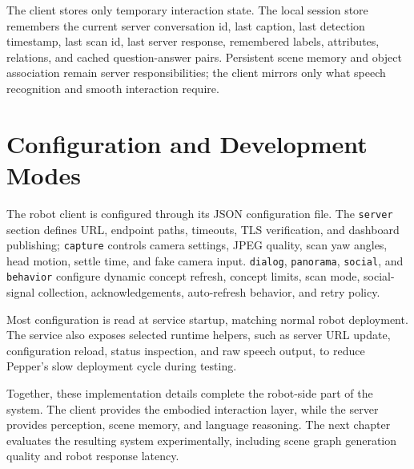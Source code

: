 The client stores only temporary interaction state.
The local session store remembers the current server conversation id, last caption, last detection timestamp, last scan id, last server response, remembered labels, attributes, relations, and cached question-answer pairs.
Persistent scene memory and object association remain server responsibilities; the client mirrors only what speech recognition and smooth interaction require.

\section{Configuration and Development Modes}\label{sec:client-configuration}

The robot client is configured through its JSON configuration file.
The \texttt{server} section defines URL, endpoint paths, timeouts, TLS verification, and dashboard publishing; \texttt{capture} controls camera settings, JPEG quality, scan yaw angles, head motion, settle time, and fake camera input.
\texttt{dialog}, \texttt{panorama}, \texttt{social}, and \texttt{behavior} configure dynamic concept refresh, concept limits, scan mode, social-signal collection, acknowledgements, auto-refresh behavior, and retry policy.

Most configuration is read at service startup, matching normal robot deployment.
The service also exposes selected runtime helpers, such as server URL update, configuration reload, status inspection, and raw speech output, to reduce Pepper's slow deployment cycle during testing.

Together, these implementation details complete the robot-side part of the system.
The client provides the embodied interaction layer, while the server provides perception, scene memory, and language reasoning.
The next chapter evaluates the resulting system experimentally, including scene graph generation quality and robot response latency.
